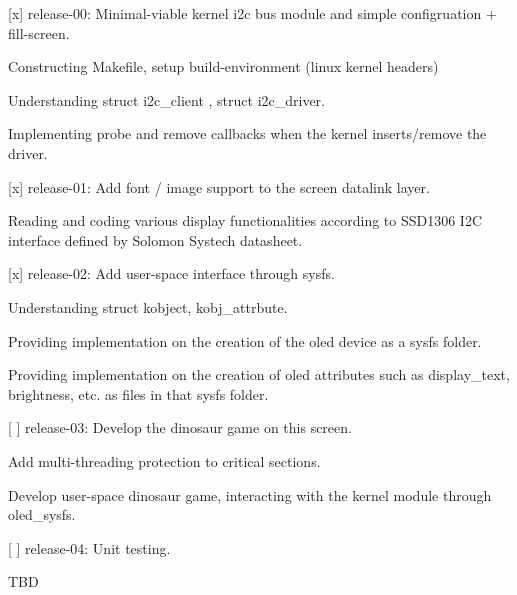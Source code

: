 \begin{DoxyItemize}
\item \mbox{[}x\mbox{]} release-\/00\+: Minimal-\/viable kernel i2c bus module and simple configruation + fill-\/screen.
\begin{DoxyItemize}
\item Constructing Makefile, setup build-\/environment (linux kernel headers)
\item Understanding struct i2c\+\_\+client , struct i2c\+\_\+driver.
\item Implementing probe and remove callbacks when the kernel inserts/remove the driver.
\end{DoxyItemize}
\item \mbox{[}x\mbox{]} release-\/01\+: Add font / image support to the screen datalink layer.
\begin{DoxyItemize}
\item Reading and coding various display functionalities according to S\+S\+D1306 I2C interface defined by Solomon Systech datasheet.
\end{DoxyItemize}
\item \mbox{[}x\mbox{]} release-\/02\+: Add user-\/space interface through sysfs.
\begin{DoxyItemize}
\item Understanding struct kobject, kobj\+\_\+attrbute.
\item Providing implementation on the creation of the oled device as a sysfs folder.
\item Providing implementation on the creation of oled attributes such as display\+\_\+text, brightness, etc. as files in that sysfs folder.
\end{DoxyItemize}
\item \mbox{[} \mbox{]} release-\/03\+: Develop the dinosaur game on this screen.
\begin{DoxyItemize}
\item Add multi-\/threading protection to critical sections.
\item Develop user-\/space dinosaur game, interacting with the kernel module through oled\+\_\+sysfs.
\end{DoxyItemize}
\item \mbox{[} \mbox{]} release-\/04\+: Unit testing.
\begin{DoxyItemize}
\item T\+BD 
\end{DoxyItemize}
\end{DoxyItemize}